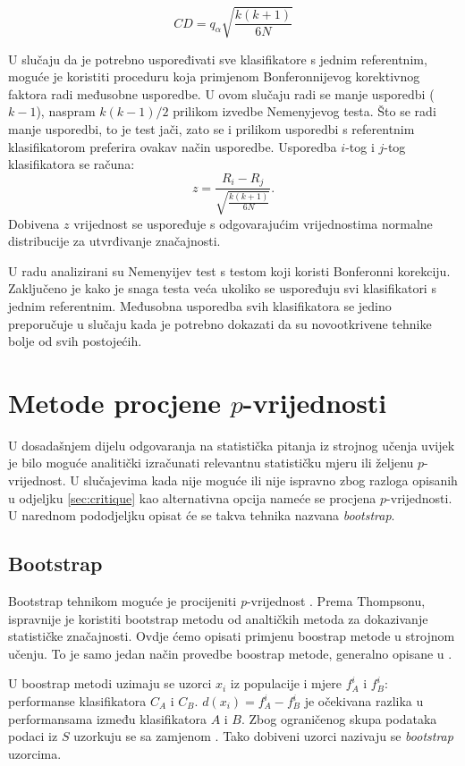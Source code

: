 $$
CD = q_{\alpha}\sqrt{\frac{k(k+1)}{6N}}
$$

U slučaju da je potrebno uspoređivati sve klasifikatore s jednim referentnim, moguće je koristiti proceduru koja primjenom Bonferonnijevog korektivnog faktora radi međusobne usporedbe. U ovom slučaju radi se manje usporedbi ($k-1$), naspram $k(k-1)/2$ prilikom izvedbe Nemenyjevog testa. Što se radi manje usporedbi, to je test jači, zato se i prilikom usporedbi s referentnim klasifikatorom preferira ovakav način usporedbe. Usporedba $i$-tog i $j$-tog klasifikatora se računa:
$$
z = \frac{R_i - R_j}{\sqrt{\frac{k(k+1)}{6N}}}.
$$
Dobivena $z$ vrijednost se uspoređuje s odgovarajućim vrijednostima normalne distribucije za utvrđivanje značajnosti. 

U radu \citep{demvsar2006statistical} analizirani su Nemenyijev test s testom koji koristi Bonferonni korekciju. Zaključeno je kako je snaga testa veća ukoliko se uspoređuju svi klasifikatori s jednim referentnim. Međusobna usporedba svih klasifikatora se jedino preporučuje u slučaju kada je potrebno dokazati da su novootkrivene tehnike bolje od svih postojećih.

\section{Metode procjene $p$-vrijednosti}

U dosadašnjem dijelu odgovaranja na statistička pitanja iz strojnog učenja uvijek je bilo moguće analitički izračunati relevantnu statističku mjeru ili željenu $p$-vrijednost. U slučajevima kada nije moguće ili nije ispravno zbog razloga opisanih u odjeljku \ref{sec:critique} kao alternativna opcija nameće se procjena $p$-vrijednosti. U narednom pododjeljku opisat će se takva tehnika nazvana \textit{bootstrap}.

\subsection{Bootstrap}
\label{subsec:bootstrap}
Bootstrap tehnikom moguće je procijeniti \textit{p}-vrijednost \citep{thompson1993use}. Prema Thompsonu, ispravnije je koristiti bootstrap metodu od analtičkih metoda za dokazivanje statističke značajnosti. Ovdje ćemo opisati primjenu boostrap metode u strojnom učenju. To je samo jedan način provedbe boostrap metode, generalno opisane u \citep{efron1993introduction}. 

U boostrap metodi \citep{berg2012empirical} uzimaju se uzorci $x_i$ iz populacije i mjere  $f_{A}^{i}$ i $f_{B}^{i}$: performanse klasifikatora $C_A$ i $C_B$. $d(x_i) = f_{A}^{i} - f_{B}^{i}$ je očekivana razlika u performansama između klasifikatora $A$ i $B$. Zbog ograničenog skupa podataka podaci iz $S$ uzorkuju se sa zamjenom . Tako dobiveni uzorci nazivaju se \textit{bootstrap} uzorcima.

